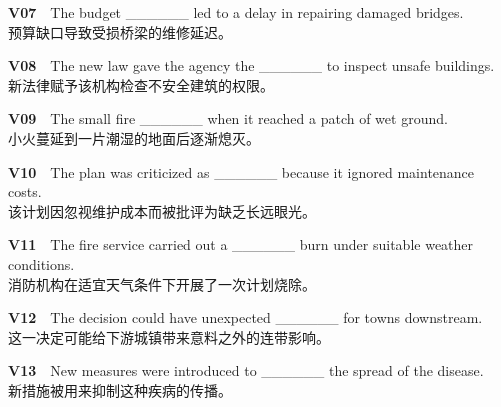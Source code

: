 \documentclass[a4paper,11pt,openany]{report}
\newcommand{\zhline}[1]{{\CJKsf\color{bodygrey}#1}}
\begin{document}
\begin{samepage}
\textbf{V07}　The budget \_\_\_\_\_\_ led to a delay in repairing damaged bridges.\\
\zhline{预算缺口导致受损桥梁的维修延迟。}
\par\end{samepage}

\begin{samepage}
\textbf{V08}　The new law gave the agency the \_\_\_\_\_\_ to inspect unsafe buildings.\\
\zhline{新法律赋予该机构检查不安全建筑的权限。}
\par\end{samepage}

\begin{samepage}
\textbf{V09}　The small fire \_\_\_\_\_\_ when it reached a patch of wet ground.\\
\zhline{小火蔓延到一片潮湿的地面后逐渐熄灭。}
\par\end{samepage}

\begin{samepage}
\textbf{V10}　The plan was criticized as \_\_\_\_\_\_ because it ignored maintenance costs.\\
\zhline{该计划因忽视维护成本而被批评为缺乏长远眼光。}
\par\end{samepage}

\begin{samepage}
\textbf{V11}　The fire service carried out a \_\_\_\_\_\_ burn under suitable weather conditions.\\
\zhline{消防机构在适宜天气条件下开展了一次计划烧除。}
\par\end{samepage}

\begin{samepage}
\textbf{V12}　The decision could have unexpected \_\_\_\_\_\_ for towns downstream.\\
\zhline{这一决定可能给下游城镇带来意料之外的连带影响。}
\par\end{samepage}

\begin{samepage}
\textbf{V13}　New measures were introduced to \_\_\_\_\_\_ the spread of the disease.\\
\zhline{新措施被用来抑制这种疾病的传播。}
\par\end{samepage}
\end{document}

